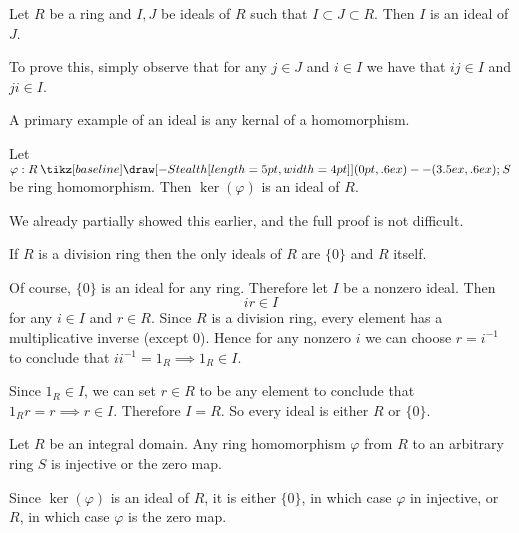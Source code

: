 \documentclass[12pt,letterpaper]{algebra_book}
\renewcommand{\to}{\mathbin{\tikz[baseline] \draw[-{Stealth[length=5pt,width=4pt]}] (0pt,.6ex) -- (3.5ex,.6ex);}}
\renewcommand{\phi}{\varphi}
\theoremstyle{definition}
\begin{document}
    \begin{proposition}
        Let $R$ be a ring and $I, J$ be ideals of $R$ such that $I
        \subset J \subset R$. Then $I$ is an ideal of $J$.
    \end{proposition}

    \begin{prf}
        To prove this, simply observe that for any $j \in J$ and
        $i \in I$ we have that $ij \in I$ and $ji \in I$. 
    \end{prf}

    A primary example of an ideal is any kernal of a homomorphism.
    
    \begin{lemma}
        Let $\phi:R \to S$ be ring homomorphism. Then $\ker(\phi)$
        is an ideal of $R$.
    \end{lemma}

    We already partially showed this earlier, and the full proof
    is not difficult. 

    \begin{lemma} \label{divison_ring_thm}
        If $R$ is a division ring then the only ideals of $R$ are
        $\{0\}$ and $R$ itself.
    \end{lemma}

    \begin{prf}
        Of course, $\{0\}$ is an ideal for any ring. Therefore let
        $I$ be a nonzero ideal. Then 
        \[ 
            ir \in I
        \] 
        for any $i \in I$ and $r \in R$. Since $R$ is a division ring, every
        element has a multiplicative inverse (except 0). Hence for
        any nonzero $i$ we can choose $r = i^{-1}$ to conclude
        that $ii^{-1} = 1_R \implies 1_R \in I$. 

        Since $1_R \in I$, we can set $r \in R$ to be any element
        to conclude that $1_Rr = r \implies r \in I$. Therefore $I
        = R$. So every ideal is either $R$ or $\{0\}$.
    \end{prf}

    \begin{proposition}
        Let $R$ be an integral domain. Any
        ring homomorphism $\phi$ from $R$ to an arbitrary ring $S$ is
        injective or the zero map.
    \end{proposition}

    \begin{prf}
        Since $\ker(\phi)$ is an ideal of $R$, it is either
        $\{0\}$, in which case $\phi$ in injective, or $R$, in
        which case $\phi$ is the zero map.
    \end{prf}
\end{document}
